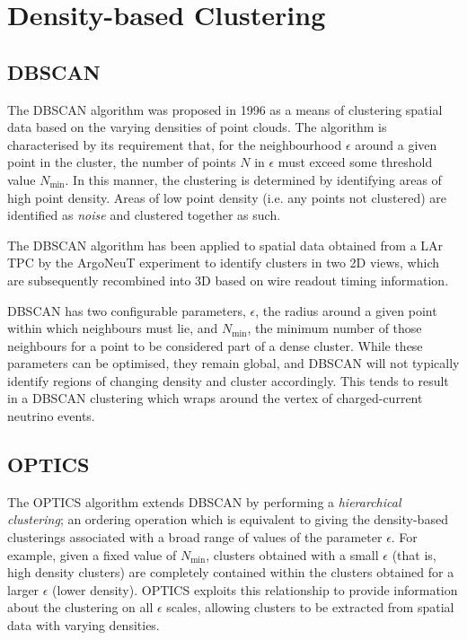 \section{Density-based Clustering}
\subsection{\acs{DBSCAN}}\label{sec:latte_dbscan}
The \ac{DBSCAN} algorithm was proposed in 1996 as a means of clustering spatial data based on the varying densities of point clouds\citep{Ester1996}. The algorithm is characterised by its requirement that, for the neighbourhood $\epsilon$ around a given point in the cluster, the number of points $N$ in $\epsilon$ must exceed some threshold value $N_\mathrm{min}$. In this manner, the clustering is determined by identifying areas of high point density. Areas of low point density (i.e. any points not clustered) are identified as \emph{noise} and clustered together as such.

The \ac{DBSCAN} algorithm has been applied to spatial data obtained from a \ac{LAr TPC} by the ArgoNeuT experiment\cite{Spitz2011} to identify clusters in two 2D views, which are subsequently recombined into 3D based on wire readout timing information.

\ac{DBSCAN} has two configurable parameters, $\epsilon$, the radius around a given point within which neighbours must lie, and $N_\mathrm{min}$, the minimum number of those neighbours for a point to be considered part of a dense cluster. While these parameters can be optimised, they remain global, and \ac{DBSCAN} will not typically identify regions of changing density and cluster accordingly. This tends to result in a \ac{DBSCAN} clustering which wraps around the vertex of charged-current neutrino events.

\subsection{\acs{OPTICS}}
The \ac{OPTICS} algorithm\citep{Ankerst1999} extends \ac{DBSCAN} by performing a \emph{hierarchical clustering}; an ordering operation which is equivalent to giving the density-based clusterings associated with a broad range of values of the parameter $\epsilon$. For example, given a fixed value of $N_\mathrm{min}$, clusters obtained with a small $\epsilon$ (that is, high density clusters) are completely contained within the clusters obtained for a larger $\epsilon$ (lower density). \ac{OPTICS} exploits this relationship to provide information about the clustering on all $\epsilon$ scales, allowing clusters to be extracted from spatial data with varying densities.

